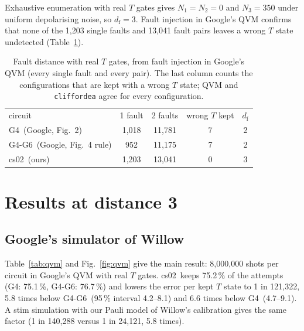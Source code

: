 \documentclass[aps,pra,reprint,superscriptaddress,longbibliography]{revtex4-2}
\newcommand{\df}{d_{\mathrm{f}}}
\newcommand{\csz}{\textsf{cs02}}
\newcommand{\Gfour}{\textsf{G4}}
\newcommand{\Gsix}{\textsf{G4-G6}}
\begin{document}
Exhaustive enumeration with real $T$ gates gives $N_1=N_2=0$ and $N_3=350$ under uniform depolarising noise, so $\df=3$.
Fault injection in Google's QVM confirms that none of the 1,203 single faults and 13,041 fault pairs leaves a wrong $T$ state undetected (Table~\ref{tab:fd}).

\begin{table}[b]
\caption{Fault distance with real $T$ gates, from fault injection in Google's QVM (every single fault and every pair). The last column counts the configurations that are kept with a wrong $T$ state; QVM and \texttt{cliffordea} agree for every configuration.}
\label{tab:fd}
\begin{ruledtabular}
\begin{tabular}{lcccc}
circuit & 1 fault & 2 faults & wrong $T$ kept & $\df$\\
\colrule
\Gfour\ (Google, Fig.~2) & 1,018 & 11,781 & 7 & 2\\
\Gsix\ (Google, Fig.~4 rule) & 952 & 11,175 & 7 & 2\\
\csz\ (ours) & 1,203 & 13,041 & 0 & 3\\
\end{tabular}
\end{ruledtabular}
\end{table}

\section{Results at distance 3}
\label{sec:results}

\subsection{Google's simulator of Willow}

Table~\ref{tab:qvm} and Fig.~\ref{fig:qvm} give the main result: 8,000,000 shots per circuit in Google's QVM with real $T$ gates.
\csz\ keeps 75.2\,\% of the attempts (\Gfour: 75.1\,\%, \Gsix: 76.7\,\%) and lowers the error per kept $T$ state to 1 in 121,322, 5.8 times below \Gsix\ (95\,\% interval 4.2--8.1) and 6.6 times below \Gfour\ (4.7--9.1).
A stim simulation with our Pauli model of Willow's calibration gives the same factor (1 in 140,288 versus 1 in 24,121, 5.8 times).
\end{document}
